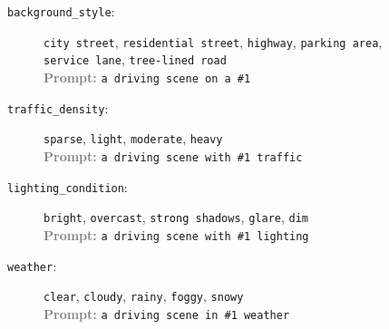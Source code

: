 \begin{figure}[t]
\begin{tcolorbox}
\begin{description}
    \item[\texttt{background\_style}:] \texttt{city street}, \texttt{residential street}, \texttt{highway}, \texttt{parking area}, \texttt{service lane}, \texttt{tree-lined road} \\
    \textcolor{gray}{\textbf{Prompt:}} \texttt{a driving scene on a \#1}

    \item[\texttt{traffic\_density}:] \texttt{sparse}, \texttt{light}, \texttt{moderate}, \texttt{heavy} \\
    \textcolor{gray}{\textbf{Prompt:}} \texttt{a driving scene with \#1 traffic}

    \item[\texttt{lighting\_condition}:] \texttt{bright}, \texttt{overcast}, \texttt{strong shadows}, \texttt{glare}, \texttt{dim} \\
    \textcolor{gray}{\textbf{Prompt:}} \texttt{a driving scene with \#1 lighting}

    \item[\texttt{weather}:] \texttt{clear}, \texttt{cloudy}, \texttt{rainy}, \texttt{foggy}, \texttt{snowy} \\
    \textcolor{gray}{\textbf{Prompt:}} \texttt{a driving scene in \#1 weather}
\end{description}
\end{tcolorbox}
\end{figure}

